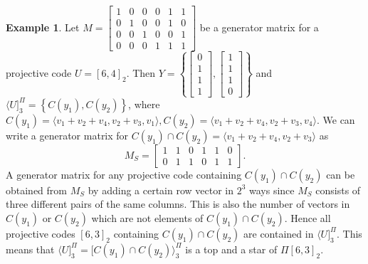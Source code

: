 \documentclass[12pt]{article}
\theoremstyle{definition}
\newtheorem{exmp}{Example}
\begin{document}
\begin{exmp}
  Let $M=\left[\begin{matrix}
               1 & 0 & 0 & 0 & 1& 1\\
               0 & 1 & 0 & 0 & 1 & 0 \\
               0 & 0 & 1 & 0 & 0 & 1 \\
               0 & 0 & 0 & 1 & 1 & 1
             \end{matrix}\right]$ be a generator matrix for a projective code $U=[6, 4]_2$. Then $Y=\left\{\left[\begin{matrix}
                                                        0 \\
                                                        1 \\
                                                        1 \\
                                                        1
                                                      \end{matrix}\right],\left[\begin{matrix}
                                                        1 \\
                                                        1 \\
                                                        1 \\
                                                        0
                                                      \end{matrix}\right]\right\}$ and $\langle U]^{\Pi}_{3}=\left\{C(y_1), C(y_2)\right\}$, where $C(y_1)=\langle v_1+v_2+v_4, v_2+v_3, v_1\rangle, C(y_2)=\langle v_1+v_2+v_4, v_2+v_3, v_4\rangle.$ We can write a generator matrix
                                                      for $C(y_1)\cap C(y_2)=\langle v_1+v_2+v_4, v_2+v_3\rangle$ as
                                                       $$M_S=\left[\begin{matrix}
               1 & 1 & 0 & 1 & 1& 0\\
               0 & 1 & 1 & 0 & 1 & 1
             \end{matrix}\right].$$
     A        generator matrix           for any projective code containing $C(y_1)\cap C(y_2)$ can be obtained from $M_S$ by adding a certain row vector in $2^3$ ways since $M_S$       consists of three different pairs of the same columns. This is also the number of vectors in $C(y_1)$ or $C(y_2)$ which are not elements of $C(y_1)\cap C(y_2)$. Hence all  projective codes $[6, 3]_2$ containing $C(y_1)\cap C(y_2)$ are contained in $\langle U]^{\Pi}_{3}$. This means that $\langle U]^{\Pi}_{3}=[C(y_1)\cap C(y_2)\rangle^{\Pi}_{3}$ is a top and a star of $\Pi[6,3]_{2}$.

\end{exmp}
\end{document}
